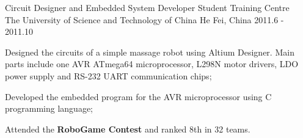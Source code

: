 \begin{cventries}
    \cventry
      {Circuit Designer and Embedded System Developer}%
      {Student Training Centre \\ The University of Science and Technology of China}%
      {He Fei, China}%
      {2011.6 - 2011.10}%
      {
        \begin{cvitems}
          \item Designed the circuits of a simple massage robot using Altium Designer. Main parts include one AVR ATmega64 microprocessor, L298N motor drivers, LDO power supply and RS-232 UART communication chips;
          \item Developed the embedded program for the AVR microprocessor using C programming language;
          \item Attended the \textbf{RoboGame Contest} and ranked 8th in 32 teams.
        \end{cvitems}
      }
\end{cventries}
